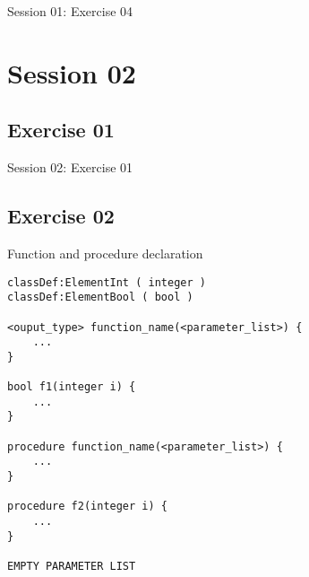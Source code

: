 \documentclass[11pt]{beamer}
\begin{document}
\begin{frame}[fragile]
\Huge
\begin{center}
Session 01: Exercise 04
\end{center}
\end{frame}

\section{Session 02}

\subsection{Exercise 01}

\begin{frame}[fragile]
\Huge
\begin{center}
Session 02: Exercise 01
\end{center}
\end{frame}

\subsection{Exercise 02}

\begin{frame}[fragile]
\begin{block}{Function and procedure declaration}
\scriptsize
\begin{lstlisting}[language=lekta]
classDef:ElementInt ( integer )
classDef:ElementBool ( bool )

<ouput_type> function_name(<parameter_list>) {
	...
}

bool f1(integer i) {
	...
}

procedure function_name(<parameter_list>) {
	...
}

procedure f2(integer i) {
	...
}

EMPTY PARAMETER LIST

\end{lstlisting}
\end{block}
\end{frame}
\end{document}
